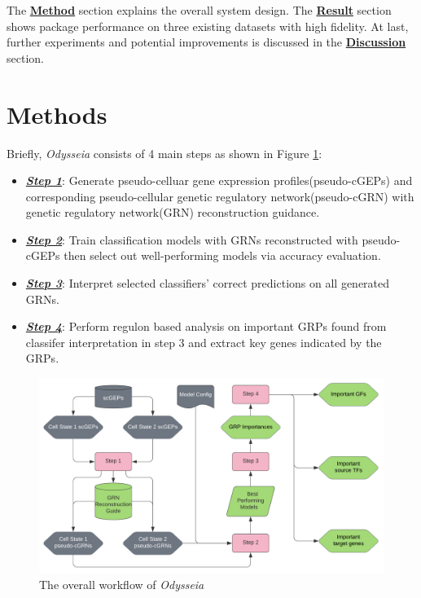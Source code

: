 \documentclass[fleqn,10pt]{wlscirep}
\begin{document}
The {\hyperref[method]{\textbf{Method}}} section explains the overall system design. The {\hyperref[res]{\textbf{Result}}} section shows package performance on three existing datasets with high fidelity. At last, further experiments and potential improvements is discussed in the {\hyperref[disc]{\textbf{Discussion}}} section. 


\section*{Methods}
\label{method}
Briefly, \emph{Odysseia} consists of 4 main steps as shown in Figure \ref{odysseia}:
\begin{itemize}
  \item \hyperref[step1]{\textbf{\emph{Step 1}}}: Generate pseudo-celluar gene expression profiles(pseudo-cGEPs) and corresponding pseudo-cellular genetic regulatory network(pseudo-cGRN) with genetic regulatory network(GRN) reconstruction guidance.
  \item \hyperref[step2]{\textbf{\emph{Step 2}}}: Train classification models with GRNs reconstructed with pseudo-cGEPs then select out well-performing models via accuracy evaluation.
  \item \hyperref[step3]{\textbf{\emph{Step 3}}}: Interpret selected classifiers' correct predictions on all generated GRNs.
  \item \hyperref[step4]{\textbf{\emph{Step 4}}}: Perform regulon based analysis on important GRPs found from classifer interpretation in step 3 and extract key genes indicated by the GRPs.
\end{itemize}


\begin{figure}[ht]
\centering
\includegraphics[width=0.8\linewidth]{image/Odysseia.png}
\caption{The overall workflow of \emph{Odysseia}}
\label{odysseia}
\end{figure}
\end{document}
